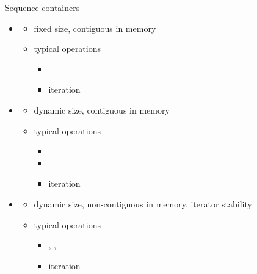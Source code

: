 \begin{frame}[fragile]{Sequence containers \insertcontinuationtext}

  \begin{itemize}
  \item {}
    \begin{itemize}
    \item fixed size, contiguous in memory
    \item typical operations
      \begin{itemize}
      \item {}
      \item iteration
      \end{itemize}
    \end{itemize}
  \item {}
    \begin{itemize}
    \item dynamic size, contiguous in memory
    \item typical operations
      \begin{itemize}
      \item {}
      \item {}
      \item iteration
      \end{itemize}
    \end{itemize}
  \item {}
    \begin{itemize}
    \item dynamic size, non-contiguous in memory, iterator stability
    \item typical operations
      \begin{itemize}
      \item {}, , 
      \item iteration
      \end{itemize}
    \end{itemize}
  \end{itemize}

\end{frame}

